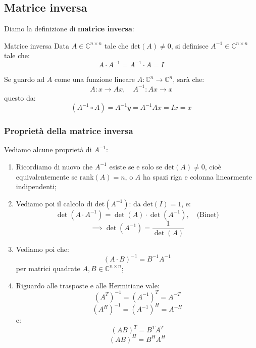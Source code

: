 \documentclass[a4paper,11pt]{article}
\begin{document}
\subsection{Matrice inversa}
Diamo la definizione di \textbf{matrice inversa}:
\begin{definition}{Matrice inversa}
	Data $A \in \mathbb{C}^{n \times n}$ tale che $\mathrm{det}(A) \neq 0$, si definisce $A^{-1} \in \mathbb{C}^{n \times n}$ tale che:
	$$
	A \cdot A^{-1} = A^{-1} \cdot A = I
	$$
\end{definition}
Se guardo ad $A$ come una funzione lineare $A : \mathbb{C}^n \rightarrow \mathbb{C}^n$, sarà che:
$$
A : x \rightarrow Ax, \quad A^{-1} : Ax \rightarrow x
$$
questo da:
$$
\left(A^{-1} \circ A\right) = A^{-1} y = A^{-1} A x = Ix = x
$$

\subsubsection{Proprietà della matrice inversa}
Vediamo alcune proprietà di $A^{-1}$:
\begin{enumerate}
	\item Ricordiamo di nuovo che $A^{-1}$ esiste se e solo se $\mathrm{det}(A) \neq 0$, cioè equivalentemente se $\mathrm{rank}(A) = n$, o $A$ ha spazi riga e colonna linearmente indipendenti;

		\item
Vediamo poi il calcolo di $\mathrm{det}(A^{-1})$: da $\mathrm{det}(I) = 1$, e:
$$
\det(A \cdot A^{-1}) = \det(A) \cdot \det(A^{-1}), \quad \text{(Binet)}
$$
$$
\implies \det(A^{-1}) = \frac{1}{\det(A)}
$$

\item Vediamo poi che:
$$
(A \cdot B)^{-1} = B^{-1} A^{-1}
$$
per matrici quadrate $A, B \in \mathbb{C}^{n \times n}$;

\item Riguardo alle trasposte e alle Hermitiane vale:
	$$
		(A^T)^{-1} = (A^{-1})^T = A^{-T}
	$$
	$$
		(A^H)^{-1} = (A^{-1})^H = A^{-H}
	$$
	e:
	$$
	(AB)^T = B^T A^T
	$$
	$$
	(AB)^H = B^H A^H
	$$
\end{enumerate}
\end{document}
